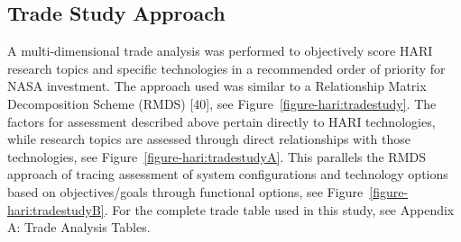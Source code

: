 \subsection{Trade Study Approach}
A multi-dimensional trade analysis was performed to objectively score HARI research topics and specific technologies in a recommended order of priority for NASA investment.
The approach used was similar to a Relationship Matrix Decomposition Scheme (RMDS) [40], see Figure~\ref{figure-hari:tradestudy}.
The factors for assessment described above pertain directly to HARI technologies, while research topics are assessed through direct relationships with those technologies, see Figure~\ref{figure-hari:tradestudyA}.
This parallels the RMDS approach of tracing assessment of system configurations and technology options based on objectives/goals through functional options, see Figure~\ref{figure-hari:tradestudyB}.
For the complete trade table used in this study, see Appendix A: Trade Analysis Tables.

